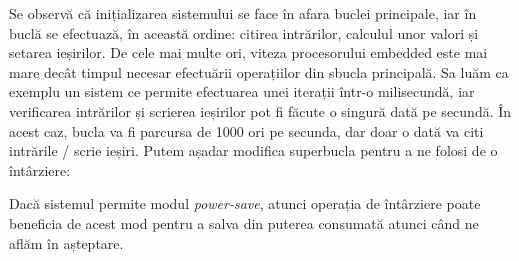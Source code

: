 
Se observă că inițializarea sistemului se face în afara buclei principale, iar în buclă se efectuază, în această ordine: citirea intrărilor, calculul unor valori și setarea ieșirilor. De cele mai multe ori, viteza procesorului embedded este mai mare decât timpul necesar efectuării operațiilor din sbucla principală. Sa luăm ca exemplu un sistem ce permite efectuarea unei iterații într-o milisecundă, iar verificarea intrărilor și scrierea ieșirilor pot fi făcute o singură dată pe secundă. În acest caz, bucla va fi parcursa de 1000 ori pe secunda, dar doar o dată va citi intrările / scrie ieșiri. Putem așadar modifica superbucla pentru a ne folosi de o întârziere:


Dacă sistemul permite modul \textit{power-save}, atunci operația de întârziere poate beneficia de acest mod pentru a salva din puterea consumată atunci când ne aflăm în așteptare.

